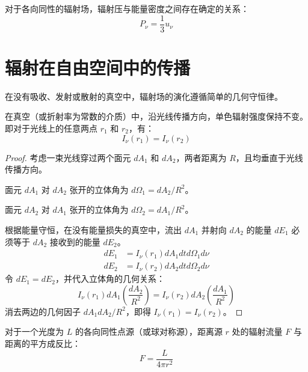 \begin{theorem}[辐射压和辐射密度的关系]
    对于各向同性的辐射场，辐射压与能量密度之间存在确定的关系：
    \begin{equation}
        P_\nu = \frac{1}{3} u_\nu
    \end{equation}
\end{theorem}


\section{辐射在自由空间中的传播}

在没有吸收、发射或散射的真空中，辐射场的演化遵循简单的几何守恒律。

\begin{theorem}[强度不变原理]
    在真空（或折射率为常数的介质）中，沿光线传播方向，单色辐射强度保持不变。即对于光线上的任意两点 $r_1$ 和 $r_2$，有：
    \begin{equation}
        I_\nu(r_1) = I_\nu(r_2)
    \end{equation}
\end{theorem}

\begin{proof}
    考虑一束光线穿过两个面元 $dA_1$ 和 $dA_2$，两者距离为 $R$，且均垂直于光线传播方向。
    
    面元 $dA_1$ 对 $dA_2$ 张开的立体角为 $d\Omega_1 = dA_2 / R^2$。
    
    面元 $dA_2$ 对 $dA_1$ 张开的立体角为 $d\Omega_2 = dA_1 / R^2$。
    
    根据能量守恒，在没有能量损失的真空中，流出 $dA_1$ 并射向 $dA_2$ 的能量 $dE_1$ 必须等于 $dA_2$ 接收到的能量 $dE_2$。
    \begin{align}
        dE_1 &= I_\nu(r_1) dA_1 dt d\Omega_1 d\nu \\
        dE_2 &= I_\nu(r_2) dA_2 dt d\Omega_2 d\nu
    \end{align}
    令 $dE_1 = dE_2$，并代入立体角的几何关系：
    \begin{equation}
        I_\nu(r_1) dA_1 \left( \frac{dA_2}{R^2} \right) = I_\nu(r_2) dA_2 \left( \frac{dA_1}{R^2} \right)
    \end{equation}
    消去两边的几何因子 $dA_1 dA_2 / R^2$，即得 $I_\nu(r_1) = I_\nu(r_2)$。
\end{proof}

\begin{theorem}[平方反比律]
    对于一个光度为 $L$ 的各向同性点源（或球对称源），距离源 $r$ 处的辐射流量 $F$ 与距离的平方成反比：
    \begin{equation}
        F = \frac{L}{4\pi r^2}
    \end{equation}
\end{theorem}


